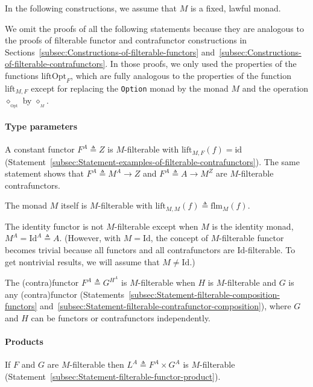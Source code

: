 In the following constructions, we assume that $M$ is a fixed, lawful
monad.

We omit the proofs of all the following statements because they are
 analogous to the proofs of filterable functor and contrafunctor constructions
in Sections~\ref{subsec:Constructions-of-filterable-functors} and~\ref{subsec:Constructions-of-filterable-contrafunctors}.
In those proofs, we only used the properties of the functions $\text{liftOpt}_{F}$,
which are fully analogous to the properties of the function $\text{lift}_{M,F}$
except for replacing the \lstinline!Option! monad by the monad $M$
and the operation $\diamond_{_{\text{Opt}}}$ by $\diamond_{_{M}}$.

\paragraph{Type parameters}

A constant functor $F^{A}\triangleq Z$ is $M$-filterable with $\text{lift}_{M,F}(f)=\text{id}$
(Statement~\ref{subsec:Statement-examples-of-filterable-contrafunctors}).
The same statement shows that $F^{A}\triangleq M^{A}\rightarrow Z$
and $F^{A}\triangleq A\rightarrow M^{Z}$ are $M$-filterable contrafunctors.

The monad $M$ itself is $M$-filterable with $\text{lift}_{M,M}(f)\triangleq\text{flm}_{M}(f)$.

The identity functor is not $M$-filterable except when $M$ is the
identity monad, $M^{A}=\text{Id}^{A}\triangleq A$. (However, with
$M=\text{Id}$, the concept of $M$-filterable functor becomes trivial
because all functors and all contrafunctors are $\text{Id}$-filterable.
To get nontrivial results, we will assume that $M\neq\text{Id}$.)

The (contra)functor $F^{A}\triangleq G^{H^{A}}$ is $M$-filterable
when $H$ is $M$-filterable and $G$ is any (contra)functor (Statements~\ref{subsec:Statement-filterable-composition-functors}
and~\ref{subsec:Statement-filterable-contrafunctor-composition}),
where $G$ and $H$ can be functors or contrafunctors independently.

\paragraph{Products}

If $F$ and $G$ are $M$-filterable then $L^{A}\triangleq F^{A}\times G^{A}$
is $M$-filterable (Statement~\ref{subsec:Statement-filterable-functor-product}).

